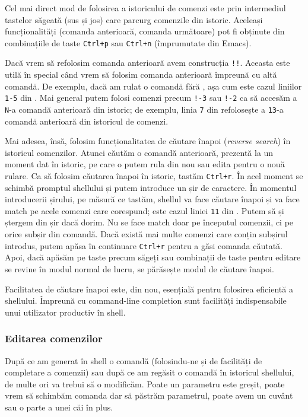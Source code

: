 Cel mai direct mod de folosirea a istoricului de comenzi este prin intermediul
tastelor săgeată (sus și jos) care parcurg comenzile din istoric. Aceleași funcționalități (comanda anterioară, comanda următoare) pot fi obținute din combinațiile de taste \texttt{Ctrl+p} sau \texttt{Ctrl+n} (împrumutate din Emacs).

Dacă vrem să refolosim comanda anterioară avem construcția \texttt{!!}. Aceasta este utilă
în special când vrem să folosim comanda anterioară împreună cu altă comandă. De
exemplu, dacă am rulat o comandă fără , așa cum este cazul liniilor \texttt{1-5} din . Mai general putem folosi comenzi precum \texttt{!-3} sau \texttt{!-2} ca să accesăm a \texttt{N}-a comandă anterioară din istoric; de exemplu, linia \texttt{7} din  refolosește a \texttt{13}-a comandă anterioară din istoricul de comenzi.

Mai adesea, însă, folosim funcționalitatea de căutare înapoi (\textit{reverse search}) în
istoricul comenzilor. Atunci căutăm o comandă anterioară, prezentă la un
moment dat în istoric, pe care o putem rula din nou sau edita pentru o nouă
rulare. Ca să folosim căutarea înapoi în istoric, tastăm \texttt{Ctrl+r}. În acel moment se
schimbă promptul shellului și putem introduce un șir de caractere. În momentul introducerii șirului, pe măsură ce tastăm, shellul va face căutare
înapoi și va face match pe acele comenzi care corespund; este cazul liniei \texttt{11} din . Putem să și ștergem din
șir dacă dorim. Nu se face match doar pe începutul comenzii, ci pe orice subșir din
comandă. Dacă există mai multe comenzi care conțin subșirul introdus, putem apăsa în continuare \texttt{Ctrl+r}
pentru a găsi comanda căutată. Apoi, dacă apăsăm pe taste precum săgeți sau combinații de taste pentru editare
se revine în modul normal de lucru, se părăsește modul de căutare înapoi.

Facilitatea de căutare înapoi este, din nou, esențială pentru folosirea
eficientă a shellului. Împreună cu command-line completion sunt facilități
indispensabile unui utilizator productiv în shell.

\subsubsection{Editarea comenzilor}
\label{sec:cli:shell:features:editing}

După ce am generat în shell o comandă (folosindu-ne și de facilități de
completare a comenzii) sau după ce am regăsit o comandă în istoricul
shellului, de multe ori va trebui să o modificăm. Poate un parametru este
greșit, poate vrem să schimbăm comanda dar să păstrăm parametrul, poate avem
un cuvânt sau o parte a unei căi în plus.

